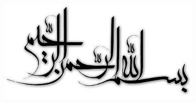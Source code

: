 



\AUTtitle
\vspace*{7cm}
\thispagestyle{empty}
\begin{center}
\includegraphics[height=5cm,width=12cm]{besm}
\end{center}